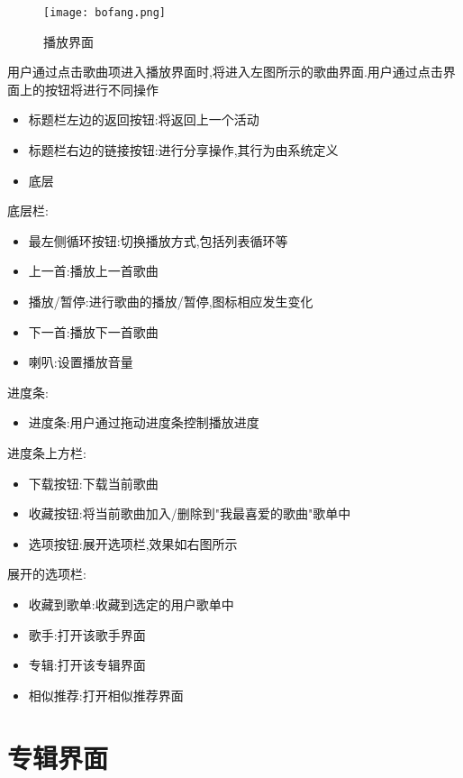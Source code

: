 \begin{figure}[H]
	\centering
	\texttt{[image: bofang.png]}
	\caption{播放界面} 
	\label{fig:figure1s8}
\end{figure}

用户通过点击歌曲项进入播放界面时,将进入左图所示的歌曲界面.用户通过点击界面上的按钮将进行不同操作
\begin{itemize}
	\item 标题栏左边的返回按钮:将返回上一个活动
	\item 标题栏右边的链接按钮:进行分享操作,其行为由系统定义
	\item 底层
\end{itemize}	



底层栏:
\begin{itemize}
	\item 最左侧循环按钮:切换播放方式,包括列表循环等
	\item 上一首:播放上一首歌曲
	\item 播放/暂停:进行歌曲的播放/暂停,图标相应发生变化
	\item 下一首:播放下一首歌曲
	\item 喇叭:设置播放音量
\end{itemize}


进度条:
\begin{itemize}
	\item 进度条:用户通过拖动进度条控制播放进度
\end{itemize}



进度条上方栏:
\begin{itemize}
	\item 下载按钮:下载当前歌曲
	\item 收藏按钮:将当前歌曲加入/删除到"我最喜爱的歌曲"歌单中
	\item 选项按钮:展开选项栏,效果如右图所示
\end{itemize}



展开的选项栏:
\begin{itemize}
	\item 收藏到歌单:收藏到选定的用户歌单中
	\item 歌手:打开该歌手界面
	\item 专辑:打开该专辑界面
	\item 相似推荐:打开相似推荐界面
\end{itemize}


\section{专辑界面}

